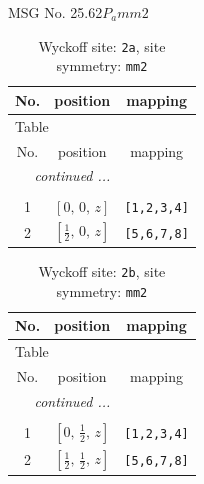 \documentclass[fleqn,8pt]{jsarticle}
\begin{document}
\setcounter{MaxMatrixCols}{32}

\renewcommand{\tablename}{Table~}
\renewcommand{\figurename}{Figure~}
\begin{center}
\LARGE
MSG No. 25.62\quad$P_{a}mm2$
\end{center}
\renewcommand{\arraystretch}{1.2}
\begin{longtable}{ccc}
\caption{Wyckoff site: {\tt 2a}, site symmetry: {\tt mm2}}
 \\
 \hline \hline
No. & position & mapping \\ \hline \endfirsthead

\multicolumn{2}{l}{\tablename\ \thetable{}} \\
 \hline \hline
No. & position & mapping \\ \hline \endhead

 \hline \hline
\multicolumn{2}{r}{\footnotesize\it continued ...} \\ \endfoot

 \hline \hline
\multicolumn{2}{r}{} \\ \endlastfoot

1 & $\left[ 0,\, 0,\, z \right]$ & {\tt [1,2,3,4]} \\ \hline
2 & $\left[ \frac{1}{2},\, 0,\, z \right]$ & {\tt [5,6,7,8]} \\
\end{longtable}
\renewcommand{\arraystretch}{1.2}
\begin{longtable}{ccc}
\caption{Wyckoff site: {\tt 2b}, site symmetry: {\tt mm2}}
 \\
 \hline \hline
No. & position & mapping \\ \hline \endfirsthead

\multicolumn{2}{l}{\tablename\ \thetable{}} \\
 \hline \hline
No. & position & mapping \\ \hline \endhead

 \hline \hline
\multicolumn{2}{r}{\footnotesize\it continued ...} \\ \endfoot

 \hline \hline
\multicolumn{2}{r}{} \\ \endlastfoot

1 & $\left[ 0,\, \frac{1}{2},\, z \right]$ & {\tt [1,2,3,4]} \\ \hline
2 & $\left[ \frac{1}{2},\, \frac{1}{2},\, z \right]$ & {\tt [5,6,7,8]} \\
\end{longtable}
\renewcommand{\arraystretch}{1.2}
\end{document}
